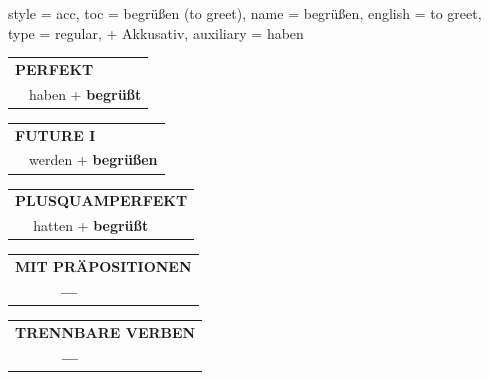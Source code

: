 \begin{verbentry}{
  style = {acc},
  toc = {begrüßen (to greet)},
  name = {begrüßen},
  english = {to greet},
  type = {regular, + Akkusativ},
  auxiliary = {haben}
}
\vspace{10pt}

\begin{tabular}{rl}
\multicolumn{2}{l}{\textbf{PERFEKT}}\\
& haben + \textbf{begrüßt}\\
\end{tabular}
\hfill
\begin{tabular}{rl}
\multicolumn{2}{l}{\textbf{FUTURE I}}\\
& werden + \textbf{begrüßen}\\
\end{tabular}
\hfill
\begin{tabular}{rl}
\multicolumn{2}{l}{\textbf{PLUSQUAMPERFEKT}}\\
& hatten + \textbf{begrüßt}\\
\end{tabular}

\vspace{10pt}

\begin{tabular}{lll}
\multicolumn{3}{l}{\textbf{MIT PRÄPOSITIONEN}}\\
& \textbf{---} & \\
\end{tabular}
\hfill
\begin{tabular}{lll}
\multicolumn{3}{l}{\textbf{TRENNBARE VERBEN}}\\
& \textbf{---} & \\
\end{tabular}

\vspace{-5pt}
\end{verbentry}

